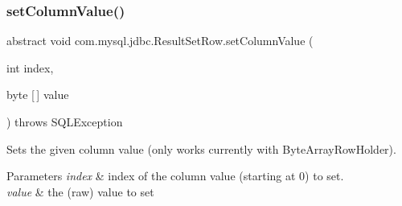 \subsubsection{\texorpdfstring{set\+Column\+Value()}{setColumnValue()}}
{\footnotesize\ttfamily abstract void com.\+mysql.\+jdbc.\+Result\+Set\+Row.\+set\+Column\+Value (\begin{DoxyParamCaption}\item[{int}]{index,  }\item[{byte \mbox{[}$\,$\mbox{]}}]{value }\end{DoxyParamCaption}) throws S\+Q\+L\+Exception\hspace{0.3cm}{\ttfamily [abstract]}}

Sets the given column value (only works currently with Byte\+Array\+Row\+Holder).


\begin{DoxyParams}{Parameters}
{\em index} & index of the column value (starting at 0) to set. \\
\hline
{\em value} & the (raw) value to set\\
\hline
\end{DoxyParams}

